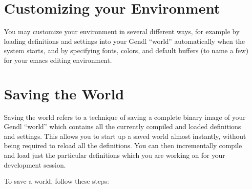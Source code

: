 \documentclass [11pt]{book}
\begin{document}
\section{Customizing your Environment}

\label{sec:customizingyourenvironment}

 You may customize your environment in several different ways,
for example by loading definitions and settings into your Gendl
``world'' automatically when the system starts, and by specifying
fonts, colors, and default buffers (to name a few) for your emacs
editing environment.

\section{Saving the World}

\label{sec:savingtheworld}

 Saving the world refers to a technique of saving a complete
binary image of your Gendl ``world'' which contains all the currently
compiled and loaded definitions and settings.  This allows you to
start up a saved world almost instantly, without being required to
reload all the definitions. You can then incrementally compile and
load just the particular definitions which you are working on for your
development session.

To save a world, follow these steps:
\end{document}
